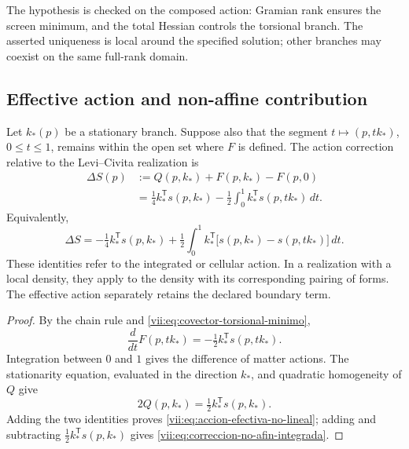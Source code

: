 The hypothesis is checked on the composed action: Gramian rank ensures
the screen minimum, and the total Hessian controls the torsional
branch. The asserted uniqueness is local around the specified
solution; other branches may coexist on the same full-rank domain.

\subsection{Effective action and non-affine contribution}
\label{vii:subsec:accion-efectiva-no-afin}

\begin{theorem}
\label{vii:thm:eliminacion-torsional-no-lineal}
Let \(k_*(p)\) be a stationary branch. Suppose also that the
segment \(t\mapsto (p,tk_*)\), \(0\leq t\leq1\), remains
within the open set where \(F\) is defined. The action correction
relative to the Levi--Civita realization is
\begin{equation}
 \begin{split}
 \Delta S(p)
  &:=Q(p,k_*)+F(p,k_*)-F(p,0)\\
  &=\tfrac14 k_*^{\mathsf T}s(p,k_*)
     -\tfrac12\int_0^1
           k_*^{\mathsf T}s(p,tk_*)\,dt.
 \end{split}
 \label{vii:eq:accion-efectiva-no-lineal}
\end{equation}
Equivalently,
\begin{equation}
 \Delta S=-\tfrac14 k_*^{\mathsf T}s(p,k_*)
  +\tfrac12\int_0^1 k_*^{\mathsf T}
       \bigl[s(p,k_*)-s(p,tk_*)\bigr]\,dt.
 \label{vii:eq:correccion-no-afin-integrada}
\end{equation}
These identities refer to the integrated or cellular action.
In a realization with a local density, they apply to the density
with its corresponding pairing of forms. The effective action
separately retains the declared boundary term.
\end{theorem}

\begin{proof}
By the chain rule and
\eqref{vii:eq:covector-torsional-minimo},
\[
 \frac{d}{dt}F(p,tk_*)
      =-\tfrac12 k_*^{\mathsf T}s(p,tk_*).
\]
Integration between \(0\) and \(1\) gives the difference of
matter actions. The stationarity equation, evaluated in the
direction \(k_*\), and quadratic homogeneity of \(Q\) give
\[
 2Q(p,k_*)=\tfrac12 k_*^{\mathsf T}s(p,k_*).
\]
Adding the two identities proves
\eqref{vii:eq:accion-efectiva-no-lineal}; adding and subtracting
\(\tfrac12k_*^{\mathsf T}s(p,k_*)\) gives
\eqref{vii:eq:correccion-no-afin-integrada}.
\end{proof}

